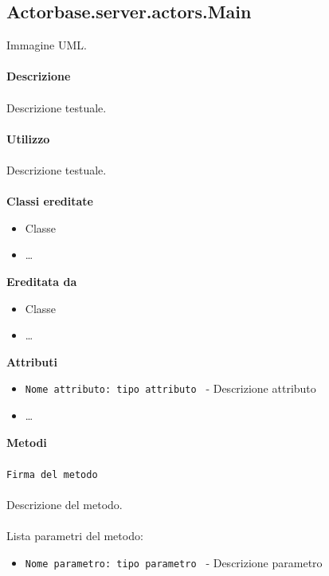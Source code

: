 \documentclass[a4paper]{article}
\begin{document}
	\subsection{Actorbase.server.actors.Main}
		Immagine UML.
		\\ \\
		\textbf{Descrizione}
			\\ \\
			Descrizione testuale.
			\\ \\
		\textbf{Utilizzo}
			\\ \\
			Descrizione testuale.
			\\ \\
		\textbf{Classi ereditate}
			\begin{itemize}
				\item Classe
				\item \dots
			\end{itemize}
		\textbf{Ereditata da}
			\begin{itemize}
				\item Classe
				\item \dots
			\end{itemize}
		\textbf{Attributi}
			\begin{itemize}
				\item \texttt{Nome attributo: tipo attributo } - Descrizione attributo
				\item \dots
			\end{itemize}
		\textbf{Metodi}
			\\ \\
			\texttt{Firma del metodo}
			\\ \\
			Descrizione del metodo.
			\\ \\
			Lista parametri del metodo:
			\begin{itemize}
				\item \texttt{Nome parametro: tipo parametro } - Descrizione parametro
			\end{itemize}
			
\end{document}
